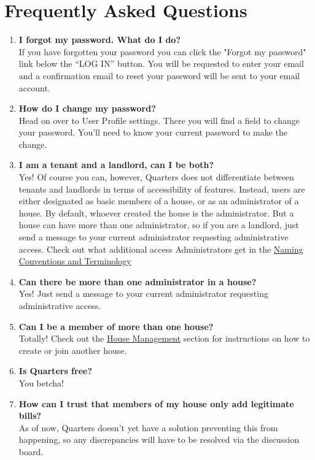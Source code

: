 \documentclass[12pt]{article}
\begin{document}
    \section{Frequently Asked Questions}
    \begin{enumerate}
    \item \textbf{I forgot my password. What do I do?} \\
    If you have forgotten your password you can click the "Forgot my password" link below the ``LOG IN'' button. You will be requested to enter your email and a confirmation email to reset your password will be sent to your email account.
    \item \textbf{How do I change my password?} \\
    Head on over to User Profile settings. There you will find a field to change your password. You'll need to know your current password to make the change.
    \item \textbf{I am a tenant and a landlord, can I be both?} \\
    Yes! Of course you can, however, Quarters does not differentiate between tenants and landlords in terms of accessibility of features. Instead, users are either designated as basic members of a house, or as an administrator of a house. By default, whoever created the house is the administrator. But a house can have more than one administrator, so if you are a landlord, just send a message to your current administrator requesting administrative access. Check out what additional access Administrators get in the \hyperref[sec:conventions]{Naming Conventions and Terminology}
    \item \textbf{Can there be more than one administrator in a house?} \\
    Yes! Just send a message to your current administrator requesting administrative access.
    \item \textbf{Can I be a member of more than one house?} \\
    Totally! Check out the \hyperref[sec:housemanagement]{House Management}  section for instructions on how to create or join another house.
    \item \textbf{Is Quarters free?} \\
    You betcha!
    \item \textbf{How can I trust that members of my house only add legitimate bills?} \\
    As of now, Quarters doesn't yet have a solution preventing this from happening, so any discrepancies will have to be resolved via the discussion board.
    \end{enumerate}

\end{document}
